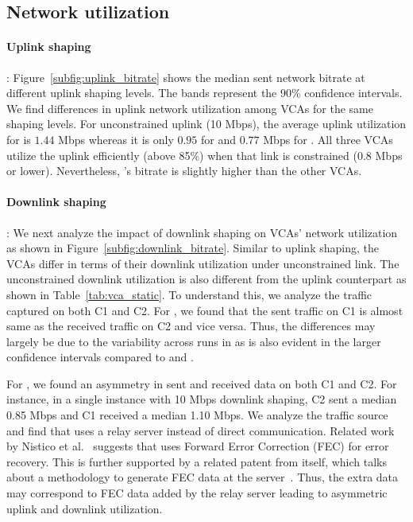 


\subsection{Network utilization}
\label{subsec:network_utilization}
\paragraph{Uplink shaping}: Figure~\ref{subfig:uplink_bitrate} shows the median sent network bitrate at different uplink shaping levels. The bands represent the 90\% confidence intervals. We find differences in uplink network utilization among VCAs for the same shaping levels. For unconstrained uplink (10 Mbps), the average uplink utilization for \teamsnative is $1.44$ Mbps whereas it is only $0.95$ for \meet and $0.77$ Mbps for \zoom. All three VCAs utilize the uplink efficiently (above 85\%) when that link is constrained (0.8 Mbps or lower).  Nevertheless, \meet's bitrate is slightly higher than the other VCAs.  


\paragraph{Downlink shaping}: We next analyze the impact of downlink shaping on VCAs' network utilization as shown in Figure~\ref{subfig:downlink_bitrate}. Similar to uplink shaping, the VCAs differ in terms of their downlink utilization under unconstrained link. The unconstrained downlink utilization is also different from the uplink counterpart as shown in Table~\ref{tab:vca_static}. To understand this, we analyze the traffic captured on both C1 and C2. For \teams, we found that the sent traffic on C1 is almost same as the received traffic on C2 and vice versa. Thus, the differences may largely be due to the variability across runs in \teams as is also evident in the larger confidence intervals compared to \zoom and \meet. 

For \zoom, we found an asymmetry in sent and received data on both C1 and C2. For instance, in a single instance with 10 Mbps downlink shaping, C2 sent a median 0.85 Mbps and C1 received a median 1.10 Mbps. We analyze the traffic source and find that \zoom uses a relay server instead of direct communication. Related work by Nistico et al.~\cite{nistico2020comparative} suggests that \zoom uses Forward Error Correction (FEC) for error recovery. This is further supported by a related patent from \zoom itself, which talks about a methodology to generate FEC data at the server~\cite{liu2019error}. Thus, the extra data may correspond to FEC data added by the relay server leading to asymmetric uplink and downlink utilization.  

